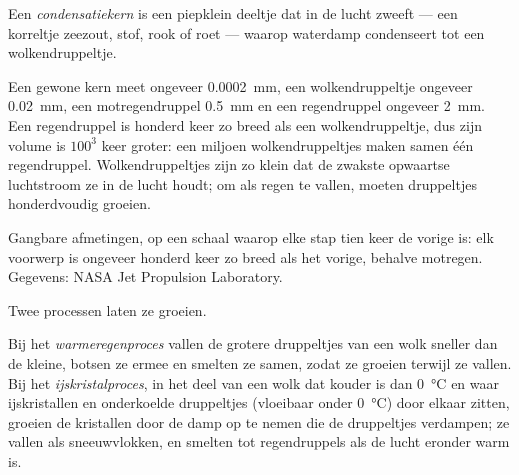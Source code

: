 \begin{definition}[Condensatiekern]\label{def:g10:why-clouds-form:nucleus}
Een \emph{condensatiekern} is een piepklein deeltje dat
in de lucht zweeft --- een korreltje zeezout, stof, rook of roet --- waarop
waterdamp condenseert tot een wolkendruppeltje.
\end{definition}

Een gewone kern meet ongeveer \qty{0.0002}{mm}, een wolkendruppeltje ongeveer
\qty{0.02}{mm}, een motregendruppel \qty{0.5}{mm} en een regendruppel ongeveer
\qty{2}{mm}. Een regendruppel is honderd keer zo breed als een wolkendruppeltje,
dus zijn volume is $100^3$ keer groter: een miljoen wolkendruppeltjes maken
samen één regendruppel. Wolkendruppeltjes zijn zo klein dat de zwakste opwaartse
luchtstroom ze in de lucht houdt; om als regen te vallen, moeten druppeltjes
honderdvoudig groeien.

\begin{omfigure}

{\small Gangbare afmetingen, op een schaal waarop elke stap tien keer de vorige
is: elk voorwerp is ongeveer honderd keer zo breed als het vorige, behalve
motregen. Gegevens: NASA Jet Propulsion Laboratory.}
\end{omfigure}

Twee processen laten ze groeien.

\begin{definition}\label{def:g10:why-clouds-form:rain-processes}
Bij het \emph{warmeregenproces} vallen de grotere
druppeltjes van een wolk sneller dan de kleine, botsen ze ermee en smelten ze
samen, zodat ze groeien terwijl ze vallen. Bij het
\emph{ijskristalproces}, in het deel van een wolk dat
kouder is dan \qty{0}{\degreeCelsius} en waar ijskristallen en onderkoelde
druppeltjes (vloeibaar onder \qty{0}{\degreeCelsius}) door elkaar zitten,
groeien de kristallen door de damp op te nemen die de druppeltjes verdampen; ze
vallen als sneeuwvlokken, en smelten tot regendruppels als de lucht eronder warm is.
\end{definition}

